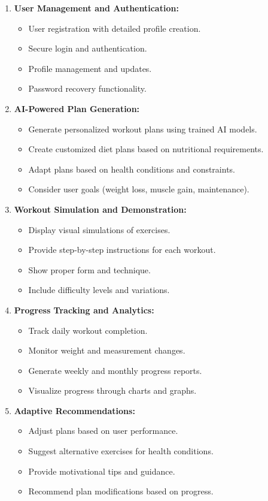 \documentclass[12pt,a4paper]{article}
\begin{document}
\begin{enumerate}
    \item \textbf{User Management and Authentication:}
    \begin{itemize}
        \item User registration with detailed profile creation.
        \item Secure login and authentication.
        \item Profile management and updates.
        \item Password recovery functionality.
    \end{itemize}
    
    \item \textbf{AI-Powered Plan Generation:}
    \begin{itemize}
        \item Generate personalized workout plans using trained AI models.
        \item Create customized diet plans based on nutritional requirements.
        \item Adapt plans based on health conditions and constraints.
        \item Consider user goals (weight loss, muscle gain, maintenance).
    \end{itemize}
    
    \item \textbf{Workout Simulation and Demonstration:}
    \begin{itemize}
        \item Display visual simulations of exercises.
        \item Provide step-by-step instructions for each workout.
        \item Show proper form and technique.
        \item Include difficulty levels and variations.
    \end{itemize}
    
    \item \textbf{Progress Tracking and Analytics:}
    \begin{itemize}
        \item Track daily workout completion.
        \item Monitor weight and measurement changes.
        \item Generate weekly and monthly progress reports.
        \item Visualize progress through charts and graphs.
    \end{itemize}
    
    \item \textbf{Adaptive Recommendations:}
    \begin{itemize}
        \item Adjust plans based on user performance.
        \item Suggest alternative exercises for health conditions.
        \item Provide motivational tips and guidance.
        \item Recommend plan modifications based on progress.
    \end{itemize}
\end{enumerate}
\end{document}
